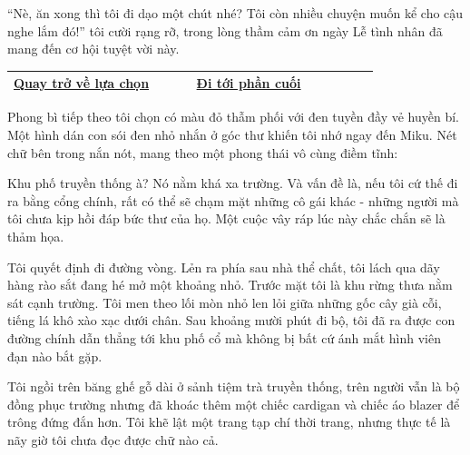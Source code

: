 \documentclass[../main.tex]{subfiles}
\begin{document}
``Nè, ăn xong thì tôi đi dạo một chút nhé? Tôi còn nhiều chuyện muốn kể cho cậu nghe lắm đó!'' tôi cười rạng rỡ, trong lòng thầm cảm ơn ngày Lễ tình nhân đã mang đến cơ hội tuyệt vời này.

\begin{table}[H]
  \centering
  \setlength{\arrayrulewidth}{1pt}
  \begin{tabular}{|>{\centering\arraybackslash}p{0.4\linewidth}|>{\centering\arraybackslash}p{0.4\linewidth}|}
    \hline
    \hyperref[choice]{Quay trở về lựa chọn} & \hyperref[ending]{Đi tới phần cuối} \\ \hline
  \end{tabular}
\end{table}

\newpage
\label{miku}

Phong bì tiếp theo tôi chọn có màu đỏ thẫm phối với đen tuyền đầy vẻ huyền bí. Một hình dán con sói đen nhỏ nhắn ở góc thư khiến tôi nhớ ngay đến Miku. Nét chữ bên trong nắn nót, mang theo một phong thái vô cùng điềm tĩnh:


Khu phố truyền thống à? Nó nằm khá xa trường. Và vấn đề là, nếu tôi cứ thế đi ra bằng cổng chính, rất có thể sẽ chạm mặt những cô gái khác - những người mà tôi chưa kịp hồi đáp bức thư của họ. Một cuộc vây ráp lúc này chắc chắn sẽ là thảm họa.

Tôi quyết định đi đường vòng. Lẻn ra phía sau nhà thể chất, tôi lách qua dãy hàng rào sắt đang hé mở một khoảng nhỏ. Trước mặt tôi là khu rừng thưa nằm sát cạnh trường. Tôi men theo lối mòn nhỏ len lỏi giữa những gốc cây già cỗi, tiếng lá khô xào xạc dưới chân. Sau khoảng mười phút đi bộ, tôi đã ra được con đường chính dẫn thẳng tới khu phố cổ mà không bị bất cứ ánh mắt hình viên đạn nào bắt gặp.

\ct


Tôi ngồi trên băng ghế gỗ dài ở sảnh tiệm trà truyền thống, trên người vẫn là bộ đồng phục trường nhưng đã khoác thêm một chiếc cardigan và chiếc áo blazer để trông đứng đắn hơn. Tôi khẽ lật một trang tạp chí thời trang, nhưng thực tế là nãy giờ tôi chưa đọc được chữ nào cả.
\end{document}
